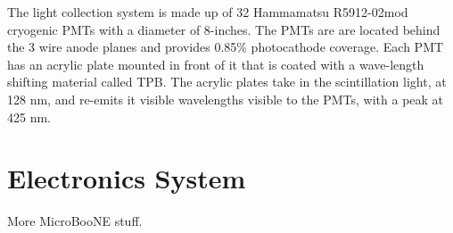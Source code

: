 The light collection system is made up of 32 Hammamatsu R5912-02mod cryogenic PMTs with a diameter of 8-inches. The PMTs are are located behind the 3 wire anode planes and provides 0.85\% photocathode coverage. Each PMT has an acrylic plate mounted in front of it that is coated with a wave-length shifting material called TPB. The acrylic plates take in the scintillation light, at 128 nm, and re-emits it visible wavelengths visible to the PMTs, with a peak at 425 nm. 
\section{Electronics System} 
More MicroBooNE stuff.
